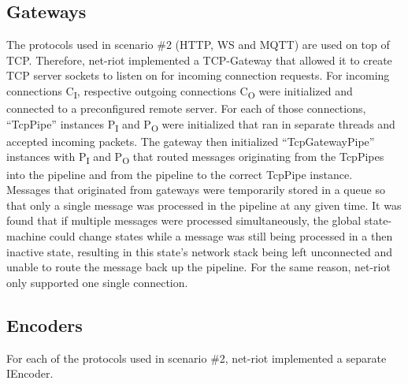 \subsection{Gateways}
The protocols used in scenario \#2 (\ac{HTTP}, \ac{WS} and \ac{MQTT}) are used on top of \ac{TCP}. Therefore, net-riot implemented a \ac{TCP}-Gateway that allowed it to create \ac{TCP} server sockets to listen on for incoming connection requests. For incoming connections C\textsubscript{I}, respective outgoing connections C\textsubscript{O} were initialized and connected to a preconfigured remote server. For each of those connections, \enquote{TcpPipe} instances P\textsubscript{I} and P\textsubscript{O} were initialized that ran in separate threads and accepted incoming packets. The gateway then initialized \enquote{TcpGatewayPipe} instances with P\textsubscript{I} and P\textsubscript{O} that routed messages originating from the TcpPipes into the pipeline and from the pipeline to the correct TcpPipe instance.\\
Messages that originated from gateways were temporarily stored in a queue so that only a single message was processed in the pipeline at any given time. It was found that if multiple messages were processed simultaneously, the global state-machine could change states while a message was still being processed in a then inactive state, resulting in this state's network stack being left unconnected and unable to route the message back up the pipeline. For the same reason, net-riot only supported one single connection.


\subsection{Encoders}
For each of the protocols used in scenario \#2, net-riot implemented a separate IEncoder.
